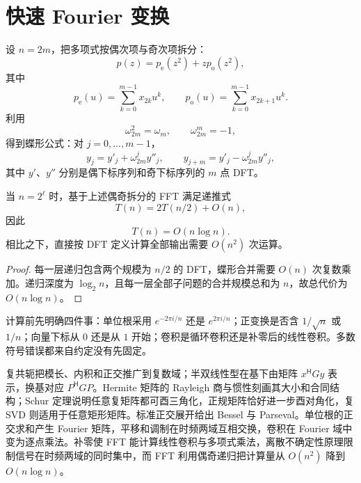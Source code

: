 \section{快速 Fourier 变换}

设 $n=2m$，把多项式按偶次项与奇次项拆分：
\[
p(z)=p_{\mathrm e}(z^2)+zp_{\mathrm o}(z^2),
\]
其中
\[
p_{\mathrm e}(u)=\sum_{k=0}^{m-1}x_{2k}u^k,
\qquad
p_{\mathrm o}(u)=\sum_{k=0}^{m-1}x_{2k+1}u^k.
\]
利用
\[
\omega_{2m}^2=\omega_m,
\qquad
\omega_{2m}^m=-1,
\]
得到蝶形公式：对 $j=0,\ldots,m-1$，
\[
y_j=y'_j+\omega_{2m}^jy''_j,
\qquad
y_{j+m}=y'_j-\omega_{2m}^jy''_j,
\]
其中 $y'$、$y''$ 分别是偶下标序列和奇下标序列的 $m$ 点 DFT。

\begin{theorem}
当 $n=2^\ell$ 时，基于上述偶奇拆分的 FFT 满足递推式
\[
T(n)=2T(n/2)+O(n),
\]
因此
\[
T(n)=O(n\log n).
\]
相比之下，直接按 DFT 定义计算全部输出需要 $O(n^2)$ 次运算。
\end{theorem}
\begin{proof}
每一层递归包含两个规模为 $n/2$ 的 DFT，蝶形合并需要 $O(n)$ 次复数乘加。递归深度为 $\log_2n$，且每一层全部子问题的合并规模总和为 $n$，故总代价为 $O(n\log n)$。
\end{proof}

\begin{method}
计算前先明确四件事：单位根采用 $e^{-2\pi i/n}$ 还是 $e^{2\pi i/n}$；正变换是否含 $1/\sqrt n$ 或 $1/n$；向量下标从 $0$ 还是从 $1$ 开始；卷积是循环卷积还是补零后的线性卷积。多数符号错误都来自约定没有先固定。
\end{method}

\begin{summary}[本章知识链]
复共轭把模长、内积和正交推广到复数域；半双线性型在基下由矩阵 $x^{\mathsf H}Gy$ 表示，换基对应 $P^{\mathsf H}GP$。Hermite 矩阵的 Rayleigh 商与惯性刻画其大小和合同结构；Schur 定理说明任意复矩阵都可酉三角化，正规矩阵恰好进一步酉对角化，复 SVD 则适用于任意矩形矩阵。标准正交展开给出 Bessel 与 Parseval。单位根的正交求和产生 Fourier 矩阵，平移和调制在时频两域互相交换，卷积在 Fourier 域中变为逐点乘法。补零使 FFT 能计算线性卷积与多项式乘法，离散不确定性原理限制信号在时频两域的同时集中，而 FFT 利用偶奇递归把计算量从 $O(n^2)$ 降到 $O(n\log n)$。
\end{summary}

